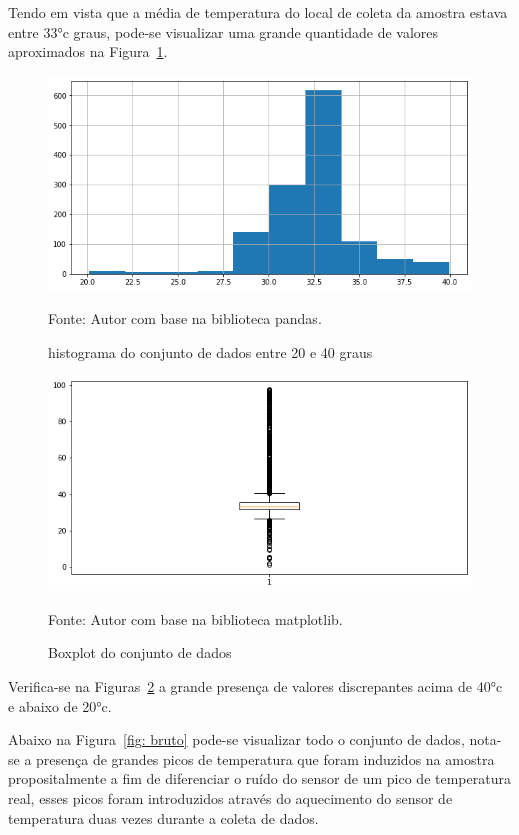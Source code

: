 Tendo em vista que a média de temperatura do local de coleta da amostra estava entre \ang{33}c graus, pode-se visualizar uma grande quantidade de valores aproximados na Figura~\ref{fig: hist2}. 

\begin{figure}[H]
	\centering
	\includegraphics[width=15cm]{imagens/sensores/hist2.png}
	\caption{histograma do conjunto de dados entre 20 e 40 graus}
	Fonte: Autor com base na biblioteca pandas.
	\label{fig: hist2}
\end{figure}

\begin{figure}[H]
	\centering
	\includegraphics[width=15cm]{imagens/sensores/boxplot.png}
	\caption{Boxplot do conjunto de dados}
	Fonte: Autor com base na biblioteca matplotlib.
	\label{fig: boxplot}
\end{figure}

Verifica-se na Figuras~\ref{fig: boxplot} a grande presença de valores discrepantes acima de \ang{40}c e abaixo de \ang{20}c.

Abaixo na Figura~\ref{fig: bruto} pode-se visualizar todo o conjunto de dados, nota-se a presença de grandes picos de temperatura que foram induzidos na amostra propositalmente a fim de diferenciar o ruído do sensor de um pico de temperatura real, esses picos foram introduzidos através do aquecimento do sensor de temperatura duas vezes durante a coleta de dados.


